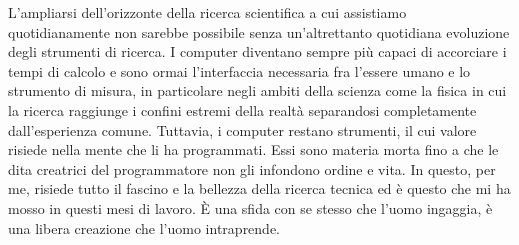 \documentclass[../main.tex]{subfiles}
\begin{document}
L'ampliarsi dell'orizzonte della ricerca scientifica a cui assistiamo quotidianamente non sarebbe possibile senza un'altrettanto quotidiana evoluzione degli strumenti di ricerca. I computer diventano sempre più capaci di accorciare i tempi di calcolo e sono ormai l'interfaccia necessaria fra l'essere umano e lo strumento di misura, in particolare negli ambiti della scienza come la fisica in cui la ricerca raggiunge i confini estremi della realtà separandosi completamente dall'esperienza comune. Tuttavia, i computer restano strumenti, il cui valore risiede nella mente che li ha programmati. Essi sono materia morta fino a che le dita creatrici del programmatore non gli infondono ordine e vita. In questo, per me, risiede tutto il fascino e la bellezza della ricerca tecnica ed è questo che mi ha mosso in questi mesi di lavoro. È una sfida con se stesso che l'uomo ingaggia, è una libera creazione che l'uomo intraprende.
\end{document}
